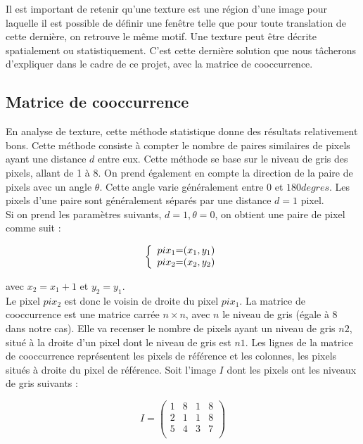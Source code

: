 Il est important de retenir qu'une texture est une région d'une image pour laquelle il est possible de définir une fenêtre telle que pour toute translation de cette dernière, on retrouve le même motif. Une texture peut être décrite spatialement ou statistiquement. C'est cette dernière solution que nous tâcherons d'expliquer dans le cadre de ce projet, avec la matrice de cooccurrence.

\subsection{Matrice de cooccurrence}

En analyse de texture, cette méthode statistique donne des résultats relativement bons. Cette méthode consiste à compter le nombre de paires similaires de pixels ayant une distance $d$ entre eux. Cette méthode se base sur le niveau de gris des pixels, allant de 1 à 8. On prend également en compte la direction de la paire de pixels avec un angle $\theta$. Cette angle varie généralement entre $0$ et $180 degres$. Les pixels d'une paire sont généralement séparés par une distance $d=1$ pixel.\\

Si on prend les paramètres suivants, $d=1, \theta = 0$, on obtient une paire de pixel comme suit :

\[
 \left \{
 \begin{array}{c @{=} c}
     pix_1 & (x_1, y_1) \\
     pix_2 & (x_2, y_2) \\
 \end{array}
 \right.
\]

avec $x_2 = x_1 + 1$ et $y_2 = y_1$.\\

Le pixel $pix_2$ est donc le voisin de droite du pixel $pix_1$. La matrice de cooccurrence est une matrice carrée $n\times n$, avec $n$ le niveau de gris (égale à 8 dans notre cas). Elle va recenser le nombre de pixels ayant un niveau de gris $n2$, situé à la droite d'un pixel dont le niveau de gris est $n1$. Les lignes de la matrice de cooccurrence représentent les pixels de référence et les colonnes, les pixels situés à droite du pixel de référence. Soit l'image $I$ dont les pixels ont les niveaux de gris suivants :

\[
 I = \begin{pmatrix}
     1 & 8 & 1 & 8 \\
     2 & 1 & 1 & 8 \\
     5 & 4 & 3 & 7 \\     
 \end{pmatrix}
\]

